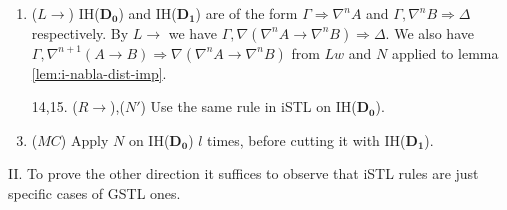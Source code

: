 \begin{enumerate}
	\item ($L\rightarrow$) IH($\mathbf{D_0}$) and IH($\mathbf{D_1}$) are of the form $\Gamma \Rightarrow \nabla^n A$ and $\Gamma , \nabla^n B \Rightarrow \Delta$ respectively. By $L\rightarrow$ we have $\Gamma , \nabla (\nabla^n A \rightarrow \nabla^n B) \Rightarrow \Delta$. We also have $\Gamma , \nabla^{n+1} (A \rightarrow B) \Rightarrow \nabla (\nabla^n A \rightarrow \nabla^n B)$ from $Lw$ and $N$ applied to lemma \ref{lem:i-nabla-dist-imp}.
	
	\item[14,15.] ($R\rightarrow$),($N'$) Use the same rule in iSTL on IH($\mathbf{D_0}$).
	\setcounter{enumi}{15}
	
	\item ($MC$) Apply $N$ on IH($\mathbf{D_0}$) $l$ times, before cutting it with IH($\mathbf{D_1}$).
\end{enumerate}
II. To prove the other direction it suffices to observe that iSTL rules are just specific cases of GSTL ones.